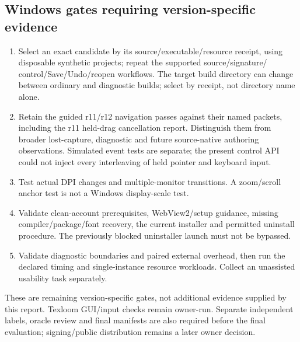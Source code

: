 \subsection{Windows gates requiring version-specific evidence}
\begin{enumerate}
\item Select an exact candidate by its source/executable/resource receipt,
using disposable synthetic projects; repeat the supported source/signature/
control/Save/Undo/reopen workflows. The target build directory can change between
ordinary and diagnostic builds; select by receipt, not directory name alone.
\item Retain the guided r11/r12 navigation passes against their named packets,
including the r11 held-drag cancellation report. Distinguish them from broader
lost-capture, diagnostic and future source-native authoring observations. Simulated
event tests are separate; the present control API could not inject every
interleaving of held pointer and keyboard input.
\item Test actual DPI changes and multiple-monitor transitions. A zoom/scroll
anchor test is not a Windows display-scale test.
\item Validate clean-account prerequisites, WebView2/setup guidance, missing
compiler/package/font recovery, the current installer and permitted uninstall
procedure. The previously blocked uninstaller launch must not be bypassed.
\item Validate diagnostic boundaries and paired external overhead, then run
the declared timing and single-instance resource workloads. Collect an
unassisted usability task separately.
\end{enumerate}
These are remaining version-specific gates, not additional evidence supplied
by this report. Texloom GUI/input checks remain owner-run. Separate
independent labels, oracle review and final manifests are also required before
the final evaluation; signing/public distribution remains a later owner decision.
